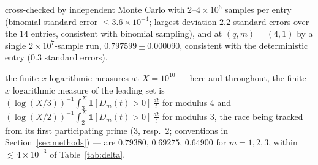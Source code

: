 cross-checked by
independent Monte Carlo with $2$--$4\times10^6$ samples per entry
(binomial standard error $\le3.6\times10^{-4}$; largest deviation
$2.2$ standard errors over the $14$ entries, consistent with binomial
sampling), and at $(q,m)=(4,1)$ by a single
$2\times10^7$-sample run, $0.797599\pm0.000090$, consistent with the
deterministic entry ($0.3$ standard errors).


the
finite-$x$ logarithmic measures at $X=10^{10}$ --- here and throughout,
the finite-$x$ logarithmic measure of the leading set is
$(\log(X/3))^{-1}\int_3^X\mathbf 1[D_m(t)>0]\,\frac{dt}{t}$ for modulus
$4$ and $(\log(X/2))^{-1}\int_2^X\mathbf 1[D_m(t)>0]\,\frac{dt}{t}$ for
modulus $3$, the race being tracked from its first participating prime
($3$, resp.\ $2$; conventions in Section~\ref{sec:methods}) --- are
$0.79380$, $0.69275$, $0.64900$ for $m=1,2,3$, within
$\lesssim4\times10^{-3}$ of Table~\ref{tab:delta}.


